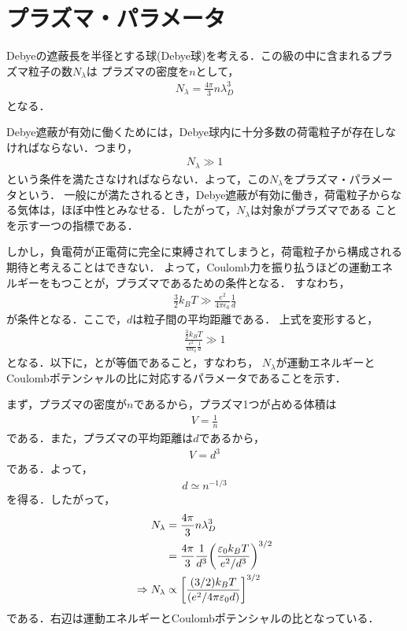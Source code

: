 \documentclass{report}
\begin{document}
\section{プラズマ・パラメータ}
Debyeの遮蔽長を半径とする球(Debye球)を考える．この級の中に含まれるプラズマ粒子の数$N_\lambda$は
プラズマの密度を$n$として，
\begin{align}
  N_\lambda = \frac{4\pi}{3}n \lambda_D^3
\end{align}
となる．

Debye遮蔽が有効に働くためには，Debye球内に十分多数の荷電粒子が存在しなければならない．つまり，
\begin{align}
  N_\lambda \gg 1 \label{plasma-parameter}
\end{align}
という条件を満たさなければならない．よって，この$N_\lambda$をプラズマ・パラメータという．
一般にが満たされるとき，Debye遮蔽が有効に働き，荷電粒子からなる気体は，ほぼ中性とみなせる．したがって，$N_\lambda$は対象がプラズマである
ことを示す一つの指標である．

しかし，負電荷が正電荷に完全に束縛されてしまうと，荷電粒子から構成される期待と考えることはできない．
よって，Coulomb力を振り払うほどの運動エネルギーをもつことが，プラズマであるための条件となる．
すなわち，
\begin{align}
  \frac{3}{2}k_B T \gg \frac{e^2}{4\pi\epsilon_0}\frac{1}{d}
\end{align}
が条件となる．ここで，$d$は粒子間の平均距離である．
上式を変形すると，
\begin{align}
  \frac{\frac{3}{2}k_B T}{\frac{e^2}{4\pi\epsilon_0}\frac{1}{d}} \gg 1 \label{plasma-parameter2}
\end{align}
となる．以下に，とが等価であること，すなわち，
$N_\lambda$が運動エネルギーとCoulombポテンシャルの比に対応するパラメータであることを示す．

まず，プラズマの密度が$n$であるから，プラズマ1つが占める体積は
\begin{align}
  V = \frac{1}{n}
\end{align}
である．また，プラズマの平均距離は$d$であるから，
\begin{align}
  V = d^3
\end{align}
である．よって，
\begin{align}
  d \simeq n^{-1/3}
\end{align}
を得る．したがって，
\begin{align}
  N_\lambda &= \frac{4\pi}{3}n \lambda_D^3\\
  &= \frac{4\pi}{3}\frac{1}{d^3}\qty(\frac{\varepsilon_0 k_B T}{e^2/d^3})^{3/2}\\
  \Rightarrow N_\lambda &\propto \qty[\frac{(3/2)k_B T}{(e^2/4\pi\varepsilon_0 d)}]^{3/2}
\end{align}
である．右辺は運動エネルギーとCoulombポテンシャルの比となっている．
\end{document}
